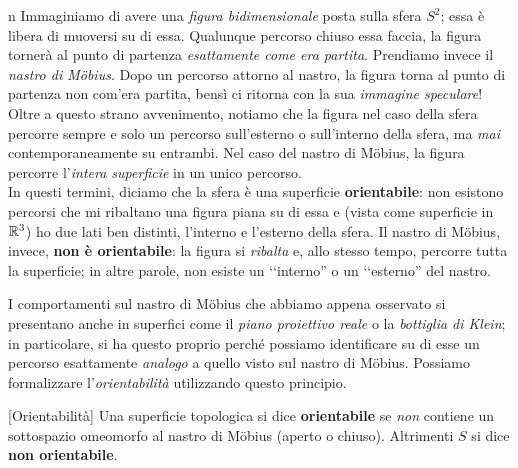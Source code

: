 \begin{intuitively}{n}
	Immaginiamo di avere una \textit{figura bidimensionale} posta sulla sfera $S^2$; essa è libera di muoversi su di essa. Qualunque percorso chiuso essa faccia, la figura tornerà al punto di partenza \textit{esattamente come era partita}. Prendiamo invece il \textit{nastro di Möbius}. Dopo un percorso attorno al nastro, la figura torna al punto di partenza non com'era partita, bensì ci ritorna con la sua \textit{immagine speculare}! Oltre a questo strano avvenimento, notiamo che la figura nel caso della sfera percorre sempre e solo un percorso sull'esterno o sull'interno della sfera, ma \textit{mai} contemporaneamente su entrambi. Nel caso del nastro di Möbius, la figura percorre l'\textit{intera superficie} in un unico percorso.\\
	In questi termini, diciamo che la sfera è una superficie \textbf{orientabile}: non esistono percorsi che mi ribaltano una figura piana su di essa e (vista come superficie in $\mathbb{R}^3$) ho due lati ben distinti, l'interno e l'esterno della sfera. Il nastro di Möbius, invece, \textbf{non è orientabile}: la figura si \textit{ribalta} e, allo stesso tempo, percorre tutta la superficie; in altre parole, non esiste un ‘‘interno'' o un ‘‘esterno'' del nastro.
\end{intuitively}
I comportamenti sul nastro di Möbius che abbiamo appena osservato si presentano anche in superfici come il \textit{piano proiettivo reale} o la \textit{bottiglia di Klein}; in particolare, si ha questo proprio perché possiamo identificare su di esse un percorso esattamente \textit{analogo} a quello visto sul nastro di Möbius. Possiamo formalizzare l'\textit{orientabilità} utilizzando questo principio.
\begin{definition}{}[Orientabilità]
	Una superficie topologica si dice \textbf{orientabile} se \textit{non} contiene un sottospazio omeomorfo al nastro di Möbius (aperto o chiuso). Altrimenti $S$ si dice \textbf{non orientabile}.
\end{definition}
